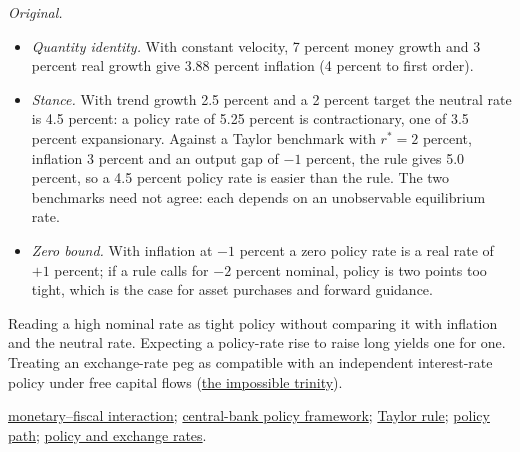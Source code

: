 \begin{qfdefinition}
 \emph{Original.}
\begin{itemize}
\item \emph{Quantity identity.} With constant velocity, 7 percent money growth and 3 percent real growth give 3.88 percent inflation (4 percent to first order).
\item \emph{Stance.} With trend growth 2.5 percent and a 2 percent target the neutral rate is 4.5 percent: a policy rate of 5.25 percent is contractionary, one of 3.5 percent expansionary. Against a Taylor benchmark with $r^*=2$ percent, inflation 3 percent and an output gap of $-1$ percent, the rule gives 5.0 percent, so a 4.5 percent policy rate is easier than the rule. The two benchmarks need not agree: each depends on an unobservable equilibrium rate.
\item \emph{Zero bound.} With inflation at $-1$ percent a zero policy rate is a real rate of $+1$ percent; if a rule calls for $-2$ percent nominal, policy is two points too tight, which is the case for asset purchases and forward guidance.
\end{itemize}

 Reading a high nominal rate as tight policy without comparing it with inflation and the neutral rate. Expecting a policy-rate rise to raise long yields one for one. Treating an exchange-rate peg as compatible with an independent interest-rate policy under free capital flows (\hyperref[def:currency-regimes-intervention]{the impossible trinity}).

 \hyperref[meth:monetary-fiscal-policy-mix]{monetary--fiscal interaction}; \hyperref[def:central-bank-policy-framework]{central-bank policy framework}; \hyperref[mod:taylor-rule]{Taylor rule}; \hyperref[meth:policy-path-ois-futures]{policy path}; \hyperref[def:flows-policy-exchange-rates]{policy and exchange rates}.

\end{qfdefinition}

